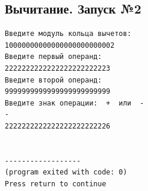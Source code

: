 \documentclass[a4paper,12pt]{article} %
\begin{document}
\subsection*{Вычитание. Запуск №2}
\begin{verbatim}
Введите модуль кольца вычетов:
10000000000000000000000002
Введите первый операнд:
2222222222222222222222223
Введите второй операнд:
9999999999999999999999999
Введите знак операции:  +  или  -
-
2222222222222222222222226


------------------
(program exited with code: 0)
Press return to continue
\end{verbatim}

\printbibliography
\end{document}
